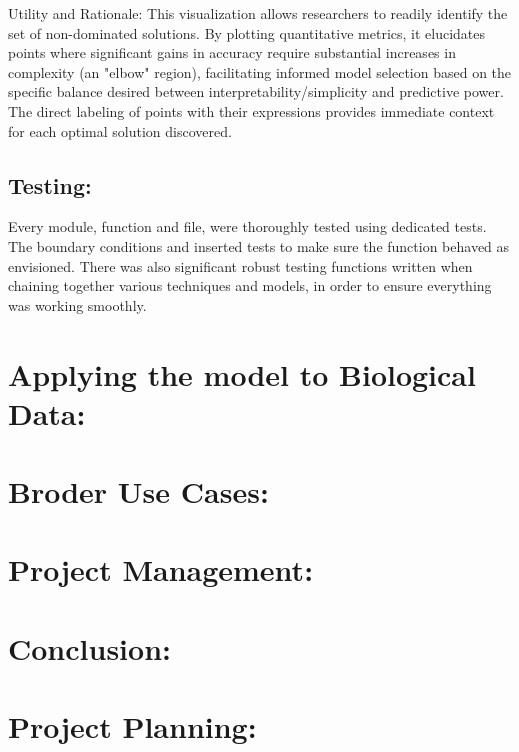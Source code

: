 \documentclass{article}
\begin{document}
Utility and Rationale: This visualization allows researchers to readily identify the set of non-dominated solutions. By plotting quantitative metrics, it elucidates points where significant gains in accuracy require substantial increases in complexity (an "elbow" region), facilitating informed model selection based on the specific balance desired between interpretability/simplicity and predictive power. The direct labeling of points with their expressions provides immediate context for each optimal solution discovered.\\





\subsection{Testing: }
Every module, function and file, were thoroughly tested using dedicated tests. The boundary conditions and inserted tests to make sure the function behaved as envisioned. There was also significant robust testing functions written when chaining together various techniques and models, in order to ensure everything was working smoothly.\\ 













\section{ Applying the model to Biological Data: }


\section{Broder Use Cases: }

\section{Project Management: }


\section{Conclusion:}


 



\section{Project Planning: }

  
\end{document}
